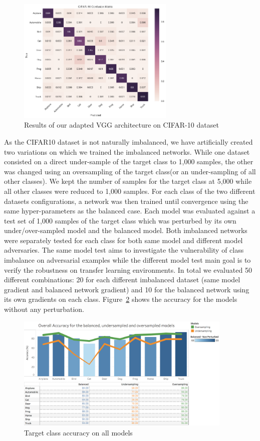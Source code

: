 \documentclass[runningheads,a4paper]{llncs}
\begin{document}
\begin{figure}
	\centering
	\includegraphics[height=6.0cm]{conf_matrix.png}
	\caption{Results of our adapted VGG architecture on CIFAR-10 dataset}
	\label{fig:conf_matrix_full}
\end{figure}

As the CIFAR10 dataset is not naturally imbalanced, we have artificially created two variations on which we trained the imbalanced networks.  While one dataset consisted on a direct under-sample of the target class to 1,000 samples, the other was changed using  an oversampling of the target class(or an under-sampling of all other classes). We kept the number of samples for the target class at 5,000 while all other classes were reduced to 1,000 samples. For each class of the two different datasets configurations, a network was then trained until convergence using the same hyper-parameters as the balanced case. Each model was evaluated against a test set of 1,000 samples of the target class which was  perturbed by its own under/over-sampled model and the balanced model. Both imbalanced networks were separately tested for each class for both same model and different model adversaries. The same model test aims to investigate the vulnerability of class imbalance on adversarial examples while the different model test main goal is to verify the robustness on transfer learning environments. In total we evaluated 50 different combinations: 20 for each different imbalanced dataset (same model gradient and balanced network gradient) and 10 for the balanced network using its own gradients on each class. Figure~\ref{fig:acc_graph} shows the accuracy for the models without any perturbation.
\begin{figure}
	\centering
	\includegraphics[height=5.5cm]{graph_non_pert.png}
	\caption{Target class accuracy on all models}
	\label{fig:acc_graph}
\end{figure}
\end{document}
